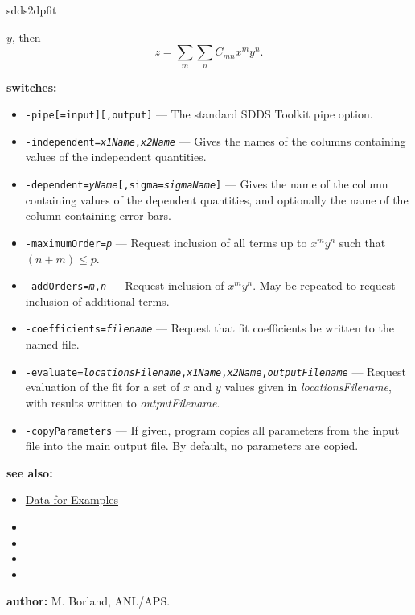 \begin{sddsprog}{sdds2dpfit}
\begin{itemize}
        $y$, then
        \begin{equation}
          z = \sum_m \sum_n C_{mn} x^m y^n.
        \end{equation}
    \end{itemize}
  \item \textbf{switches:}
    \begin{itemize}
      \item {\tt -pipe[=input][,output]} --- The standard SDDS Toolkit pipe option.
      \item {\tt -independent={\em x1Name},{\em x2Name}} --- Gives the names of the columns containing values of the independent quantities.
      \item {\tt -dependent={\em yName}[,sigma={\em sigmaName}]} --- Gives the name of the column containing values of the dependent quantities, and optionally the name of the column containing error bars.
      \item {\tt -maximumOrder={\em p}} --- Request inclusion of all terms up to $x^m y^n$ such that $(n+m)\leq p$.
      \item {\tt -addOrders={\em m},{\em n}} --- Request inclusion of $x^m y^n$. May be repeated to request inclusion of additional terms.
      \item {\tt -coefficients={\em filename}} --- Request that fit coefficients be written to the named file.
      \item {\tt -evaluate={\em locationsFilename},{\em x1Name},{\em x2Name},{\em outputFilename}} --- Request evaluation of the fit for a set of $x$ and $y$ values given in \emph{locationsFilename}, with results written to \emph{outputFilename}.
      \item {\tt -copyParameters} --- If given, program copies all parameters from the input file into the main output file. By default, no parameters are copied.
    \end{itemize}
  \item \textbf{see also:}
    \begin{itemize}
      \item \hyperref[exampleData]{Data for Examples}
      \item {}
      \item {}
      \item {}
      \item {}
    \end{itemize}
  \item \textbf{author:} M. Borland, ANL/APS.
\end{sddsprog}
